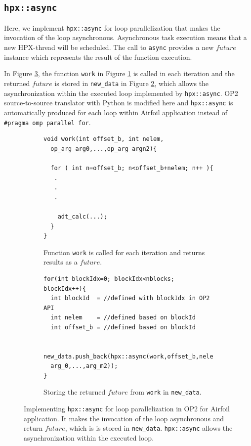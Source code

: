 \documentclass[conference]{IEEEtran}
\begin{document}
\subsection{\texttt{hpx::async}}
\label{sec:async}

Here, we implement \texttt{hpx::async} for loop parallelization that makes the invocation of the loop asynchronous. Asynchronous task execution means that a new HPX-thread will be scheduled. The call to \texttt{async} provides a new $future$ instance which represents the result of the function execution.  

In Figure \ref{l5}, the function \texttt{work} in Figure \ref{l5a} is called in each iteration and the returned $future$ is stored in \texttt{new\_data} in Figure \ref{l5b}, which allows the asynchronization within the executed loop implemented by \texttt{hpx::async}. OP2 source-to-source translator with Python is modified here and \texttt{hpx::async} is automatically produced for each loop within Airfoil application instead of \texttt{\#pragma omp parallel for}.
 
 
\begin{figure} [!h]
    \begin{subfigure}[b]{0.5\textwidth}
    \begin{lstlisting}
void work(int offset_b, int nelem,
  op_arg arg0,...,op_arg argn2){
     
  for ( int n=offset_b; n<offset_b+nelem; n++ ){
   .
   .
   .

    adt_calc(...);
  }  
}

    \end{lstlisting}
            \caption{\small{Function \texttt{work} is called for each iteration and returns results as a $future$.}}
            \label{l5a}
    \end{subfigure}
    
    \begin{subfigure}[b]{0.5\textwidth}
    \begin{lstlisting}
for(int blockIdx=0; blockIdx<nblocks; blockIdx++){
  int blockId  = //defined with blockIdx in OP2 API
  int nelem    = //defined based on blockId 
  int offset_b = //defined based on blockId

  new_data.push_back(hpx::async(work,offset_b,nelem,
  arg_0,...,arg_m2));
}

    \end{lstlisting}
     \caption{\small{Storing the returned $future$ from \texttt{work} in \texttt{new\_data}.}}
     \label{l5b}
    \end{subfigure}
    \caption{\small{Implementing \texttt{hpx::async} for loop parallelization in OP2 for Airfoil application. It makes the invocation of the loop asynchronous and return $future$, which is is stored in \texttt{new\_data}. \texttt{hpx::async} allows the asynchronization within the executed loop.}}
    \label{l5}
\end{figure}
\end{document}
